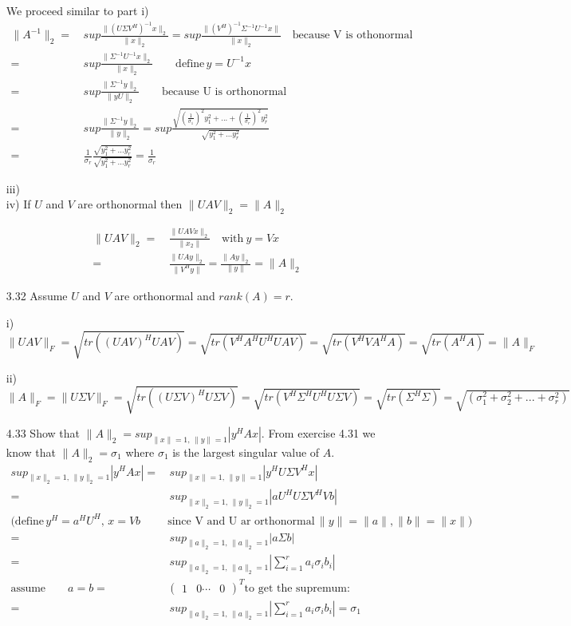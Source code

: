 \documentclass[letterpaper,12pt]{article}
\theoremstyle{definition}
\begin{document}
\begin{enumerate}
We proceed similar to part i)
\begin{align*}
\| A^{-1}\|_2 =&\, sup \frac{\|(U\Sigma V^H)^{-1}x\|_2}{\|x\|_2} = sup \frac{\|(V^H)^{-1}\Sigma^{-1} U^{-1}x\|}{\|x\|_2} \quad \text{because V is othonormal}\\
=&\, sup\frac{\|\Sigma^{-1} U^{-1}x\|_2}{\|x\|_2} \qquad \text{define}\, y=U^{-1}x\\
=&\, sup\frac{\|\Sigma^{-1} y\|_2}{\|yU\|_2} \qquad \text{because U is orthonormal} \\
=&\, sup\frac{\|\Sigma^{-1} y\|_2}{\|y\|_2} = sup\frac{\sqrt{\left(\frac{1}{\sigma_1}\right)^2y_1^2 +...+\left(\frac{1}{\sigma_r}\right)^2y_r^2}}{\sqrt{y_1^2 + ...y_r^2}} \\
=&\, \frac{1}{\sigma_r}\frac{\sqrt{y_1^2 + ...y_r^2}}{\sqrt{y_1^2 + ...y_r^2}} = \frac{1}{\sigma_r}\end{align*}

iii)\\

iv) If $U$ and $V$ are orthonormal then $\|UAV\|_2=\|A\|_2$ 

\begin{align*}
\|UAV\|_2 =&\, \frac{\|UAVx\|_2}{\|x_2\|}   \quad \text{with} \ y=Vx\\
= &\, \frac{\|UAy\|_2}{\|V^Hy\|}=   \frac{\|Ay\|_2}{\|y\|} = \|A\|_2
\end{align*}
\item[3.32]Assume $U$ and $V$ are orthonormal and $rank(A)=r$.

i) $\| UAV \|_F = \sqrt{tr((UAV)^HUAV)} = \sqrt{tr(V^HA^HU^HUAV)} = \sqrt{tr(V^HVA^HA)} = \sqrt{tr(A^HA)} = \|A\|_F$

ii)$\|A \|_F = \| U\Sigma V \|_F = \sqrt{tr((U\Sigma V)^HU\Sigma V)}= \sqrt{tr(V^H\Sigma^HU^HU\Sigma V)} = \sqrt{tr(\Sigma^H\Sigma )} = \sqrt{(\sigma_1^2+\sigma_2^2+...+\sigma_r^2)}$

\item[4.33] Show that $\| A \|_2 = sup_{\|x\|=1, \,\|y\|=1} |y^HAx|$. From exercise 4.31 we know that $\| A \|_2= \sigma_1$ where $\sigma_1$ is the largest singular value of $A$.
\begin{align*}
sup_{\|x\|_2=1, \,\|y\|_2=1} |y^HAx| =&\, sup_{\|x\|=1, \,\|y\|=1} |y^H U\Sigma V^Hx|\\
=&\, sup_{\|x\|_2=1, \,\|y\|_2=1} |aU^HU\Sigma V^HVb|\\
(\text{define} \, y^H=a^H U^H, \, x=Vb\, &\text{since V and U ar orthonormal}\, \|y\| =\|a\|, \|b\|=\|x\| )\\
=&\, sup_{\|a\|_2=1, \,\|a\|_2=1}|a\Sigma b|\\
= &\,sup_{\|a\|_2=1, \,\|a\|_2=1} |\sum_{i=1}^r a_i \sigma_i b_i| \\
\text{assume} \qquad a=b=&\begin{pmatrix}
1 & 0 \cdots&0
\end{pmatrix}^T \text{to get the supremum:}\\
= &\,sup_{\|a\|_2=1, \,\|a\|_2=1} |\sum_{i=1}^r a_i \sigma_i b_i| = \sigma_1
\end{align*}


\end{enumerate}
\end{document}
